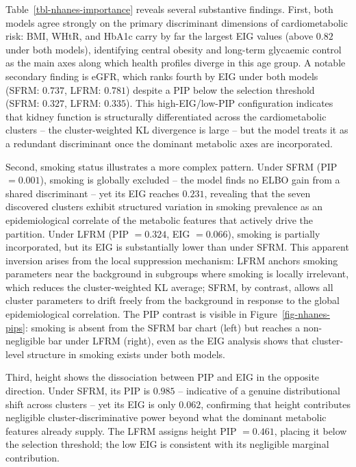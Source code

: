 \documentclass[
  letterpaper,
  DIV=11,
  numbers=noendperiod]{scrartcl}
\begin{document}
Table~\ref{tbl-nhanes-importance} reveals several substantive findings.
First, both models agree strongly on the primary discriminant dimensions
of cardiometabolic risk: BMI, WHtR, and HbA1c carry by far the largest
EIG values (above \(0.82\) under both models), identifying central
obesity and long-term glycaemic control as the main axes along which
health profiles diverge in this age group. A notable secondary finding
is eGFR, which ranks fourth by EIG under both models (SFRM: \(0.737\),
LFRM: \(0.781\)) despite a PIP below the selection threshold (SFRM:
\(0.327\), LFRM: \(0.335\)). This high-EIG/low-PIP configuration
indicates that kidney function is structurally differentiated across the
cardiometabolic clusters -- the cluster-weighted KL divergence is large
-- but the model treats it as a redundant discriminant once the dominant
metabolic axes are incorporated.

Second, smoking status illustrates a more complex pattern. Under SFRM
(PIP \(= 0.001\)), smoking is globally excluded -- the model finds no
ELBO gain from a shared discriminant -- yet its EIG reaches \(0.231\),
revealing that the seven discovered clusters exhibit structured
variation in smoking prevalence as an epidemiological correlate of the
metabolic features that actively drive the partition. Under LFRM (PIP
\(= 0.324\), EIG \(= 0.066\)), smoking is partially incorporated, but
its EIG is substantially lower than under SFRM. This apparent inversion
arises from the local suppression mechanism: LFRM anchors smoking
parameters near the background in subgroups where smoking is locally
irrelevant, which reduces the cluster-weighted KL average; SFRM, by
contrast, allows all cluster parameters to drift freely from the
background in response to the global epidemiological correlation. The
PIP contrast is visible in Figure~\ref{fig-nhanes-pips}: smoking is
absent from the SFRM bar chart (left) but reaches a non-negligible bar
under LFRM (right), even as the EIG analysis shows that cluster-level
structure in smoking exists under both models.

Third, height shows the dissociation between PIP and EIG in the opposite
direction. Under SFRM, its PIP is \(0.985\) -- indicative of a genuine
distributional shift across clusters -- yet its EIG is only \(0.062\),
confirming that height contributes negligible cluster-discriminative
power beyond what the dominant metabolic features already supply. The
LFRM assigns height PIP \(= 0.461\), placing it below the selection
threshold; the low EIG is consistent with its negligible marginal
contribution.
\end{document}
